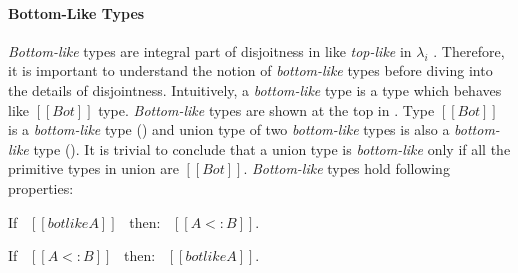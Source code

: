\paragraph{Bottom-Like Types}
\emph{Bottom-like} types are integral part of disjoitness in \cal like \emph{top-like} in
$\lambda_i$ \cite{oliveira2016disjoint}. Therefore,
it is important to understand the notion of \emph{bottom-like} types before diving into the details
of disjointness. Intuitively, a \emph{bottom-like} type is a type which behaves like $[[Bot]]$ type.
\emph{Bottom-like} types are shown at the top in . Type
$[[Bot]]$ is a \emph{bottom-like} type () and union type of two \emph{bottom-like}
types is also a \emph{bottom-like} type ().
It is trivial to conclude that a union type is \emph{bottom-like} only if all
the primitive types in union are $[[Bot]]$. \emph{Bottom-like} types hold following properties:

\begin{lemma}
  If \ $[[botlike A]]$ \ then: \ $[[A <: B]]$.
\label{lemma:union:bl-soundness}
\end{lemma}

\begin{comment}
\begin{proof}
  By induction on bottom-like relation.
  \begin{itemize}
    \item All cases are trivial to prove.
  \end{itemize}
\end{proof}
\end{comment}

\begin{lemma}
  If \ $[[A <: B]]$ \ then: \ $[[botlike A]]$.
\label{lemma:union:bl-completeness}
\end{lemma}

\begin{comment}
\begin{proof}
  By induction on type $[[A]]$.
  \begin{itemize}
    \item Cases $[[Top]]$, $[[Bot]]$, $[[Int]]$ and $[[A -> B]]$ are trivial to prove.
    \item Case $[[A \/ B]]$ requires \Cref{lemma:union:sub-or}.
  \end{itemize}
\end{proof}
\end{comment}

